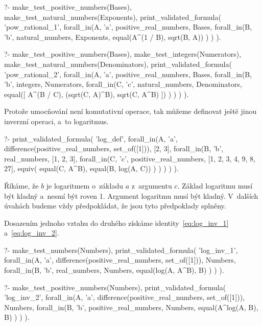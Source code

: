 \begin{fact}
\begin{prolog}
?-	make_test_positive_numbers(Bases),
	make_test_natural_numbers(Exponents),
	print_validated_formula(
		'pow_rational_1',
		forall_in(A, 'a', positive_real_numbers, Bases,
			forall_in(B, 'b', natural_numbers, Exponents,
				equal(A^(1 / B), sqrt(B, A))
			)
		)
	).				
\end{prolog}
\begin{prolog}
?-	make_test_positive_numbers(Bases),
	make_test_integers(Numerators),
	make_test_natural_numbers(Denominators),
	print_validated_formula(
		'pow_rational_2',
		forall_in(A, 'a', positive_real_numbers, Bases,
			forall_in(B, 'b', integers, Numerators,
				forall_in(C, 'c', natural_numbers, Denominators,
					equal([
						A^(B / C),
						(sqrt(C, A)^B),
						sqrt(C, A^B)
					])
				)
			)
		)
	).				
\end{prolog}
\end{fact}

Protože umocňování není komutativní operace, tak můžeme definovat ještě jinou inverzní operaci, a~to logaritmus.

\begin{prolog}
?-	print_validated_formula(
		'log_def',
		forall_in(A, 'a', difference(positive_real_numbers, set_of([1])), [2, 3],
			forall_in(B, 'b', real_numbers, [1, 2, 3],
				forall_in(C, 'c', positive_real_numbers, [1, 2, 3, 4, 9, 8, 27],
					equiv(
						equal(C, A^B),
						equal(B, log(A, C))
					)
				)
			)
		)
	).				
\end{prolog}

Říkáme, že \(b\) je logaritmem o~základu \(a\) z~argumentu \(c\). Základ logaritmu musí být kladný a~nesmí být roven 1. Argument logaritmu musí být kladný. V~dalších úvahách budeme vždy předpokládat, že jsou tyto předpoklady splněny.

Dosazením jednoho vztahu do druhého získáme identity~\eqref{eq:log_inv_1} a~\eqref{eq:log_inv_2}.

\begin{fact}
\begin{prolog}
?-	make_test_numbers(Numbers),
	print_validated_formula(
		'log_inv_1',
		forall_in(A, 'a', difference(positive_real_numbers, set_of([1])), Numbers,
			forall_in(B, 'b', real_numbers, Numbers,
				equal(log(A, A^B), B)
			)
		)
	).				
\end{prolog}
\begin{prolog}
?-	make_test_positive_numbers(Numbers),
	print_validated_formula(
		'log_inv_2',
		forall_in(A, 'a', difference(positive_real_numbers, set_of([1])), Numbers,
			forall_in(B, 'b', positive_real_numbers, Numbers,
				equal(A^log(A, B), B)
			)
		)
	).				
\end{prolog}
\end{fact}


